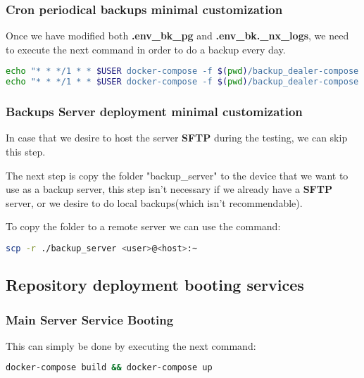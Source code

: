 \subsubsection[Cron periodical backups minimal customization]{Cron periodical backups minimal customization}
\begin{flushleft}
    Once we have modified both \textbf{.env\_bk\_pg} and \textbf{.env\_bk.\_nx\_logs}, we need to execute the next command in order to do
    a backup every day.
    \begin{lstlisting}[language=bash,label={lst:insert_to_cron}]
echo "* * */1 * * $USER docker-compose -f $(pwd)/backup_dealer-compose.yml --env-file $(pwd)/bkcli_env_folder/.env_bk_pg up" | sudo tee -a  /etc/cron.d/docker_backups
echo "* * */1 * * $USER docker-compose -f $(pwd)/backup_dealer-compose.yml --env-file $(pwd)/bkcli_env_folder/.env_bk_ng_logs up"  | sudo tee -a  /etc/cron.d/docker_backups
    \end{lstlisting}
\end{flushleft}

\newpage
\subsubsection[Backups Server deployment minimal customization]{Backups Server deployment minimal customization}
\begin{flushleft}
    In case that we desire to host the server \textbf{SFTP} during the testing, we can skip this step.
\end{flushleft}

\begin{flushleft}
    The next step is copy the folder "backup\_server" to the device that we want to use as a backup server, this step
    isn't necessary if we already have a \textbf{SFTP} server, or we desire to do local backups(which isn't recommendable).

    To copy the folder to a remote server we can use the command:
\begin{lstlisting}[language=bash,label={lst:scp}]
scp -r ./backup_server <user>@<host>:~
\end{lstlisting}
\end{flushleft}

\subsection{Repository deployment booting services}\label{subsec:repository-deployment-booting-services}
\subsubsection[Main Server Service Booting]{Main Server Service Booting}
This can simply be done by executing the next command:
\begin{lstlisting}[language=bash,label={lst:compose-up}]
docker-compose build && docker-compose up
\end{lstlisting}

